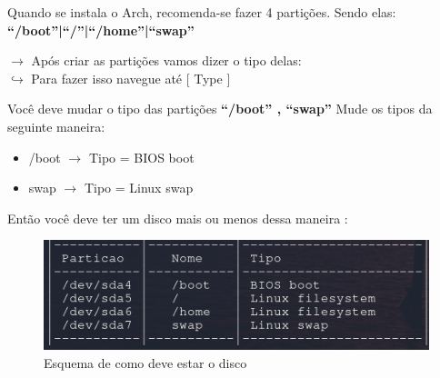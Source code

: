\documentclass[12pt, a4paper] {article}
\begin{document}
	Quando se instala o Arch, recomenda-se fazer 4 partições. Sendo elas:\\
	\centering\textbf{``/boot''|``/''|``/home''|``swap''}

	$\rightarrow$ Após criar as partições vamos dizer o tipo delas:\\
	\indent$\hookrightarrow$ Para fazer isso navegue até [ Type ]

	Você deve mudar o tipo das partições \textbf{``/boot'' , ``swap''}
	\newpage
	Mude os tipos da seguinte maneira:
	\begin{itemize}
		\item /boot $\rightarrow$ Tipo = BIOS boot\\
		\item swap $\rightarrow$ Tipo = Linux swap\\
	\end{itemize}

	Então você deve ter um disco mais ou menos dessa maneira :
	\begin{figure}[htb]
		\centering
		\includegraphics[width=\textwidth]{images/2.png}
		\caption{Esquema de como deve estar o disco}
		\label{fig:disco}
	\end{figure}
\end{document}
